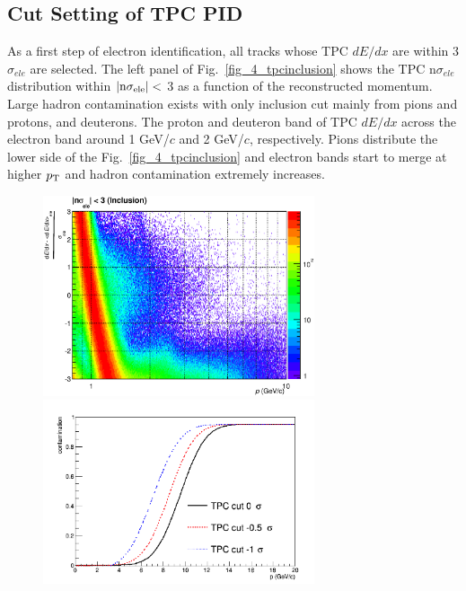 {\subsection{Cut Setting of TPC PID}
\label{sec_4_cutset}
As a first step of electron identification, all tracks whose TPC $dE/dx$ are within 3$\sigma_{ele}$ are selected. 
The left panel of Fig.~\ref{fig_4_tpcinclusion} shows the TPC n$\sigma_{ele}$ distribution within $|\rm{n}\sigma_{ele}|<$ 3 as a function of the reconstructed momentum. 
Large hadron contamination exists with only inclusion cut mainly from pions and protons, and deuterons. 
The proton and deuteron band of TPC $dE/dx$ across the electron band around 1 GeV/$c$ and 2 GeV/$c$, respectively.  
Pions distribute the lower side of the Fig.~\ref{fig_4_tpcinclusion} and electron bands start to merge at higher $p_{\rm{T}}$ and hadron contamination extremely increases.   
\begin{figure}[!h]
 \begin{minipage}{0.5\hsize}
  \begin{center}
  \includegraphics[width=8cm]{chap4/figure/PID/TPCNSigma_AfterInclusion_MB.eps}
  \end{center}
 \end{minipage}
 \begin{minipage}{0.5\hsize}
  \begin{center}
    \includegraphics[width=8cm]{chap4/figure/PID/hadroncontami_MB.png}

\end{center}
\end{minipage}
\end{figure}}
